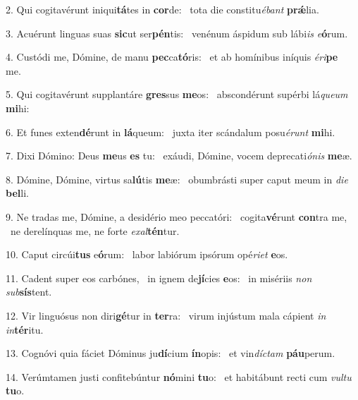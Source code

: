 2. Qui cogitavérunt iniqui\textbf{tá}tes in \textbf{cor}de: \ast\  tota die constitu\textit{é}\textit{bant} \textbf{prǽ}lia.\

3. Acuérunt linguas suas \textbf{sic}ut ser\textbf{pén}tis: \ast\  venénum áspidum sub lábi\textit{is} \textit{e}\textbf{ó}rum.\

4. Custódi me, Dómine, de manu \textbf{pec}ca\textbf{tó}ris: \ast\  et ab homínibus iníquis \textit{é}\textit{ri}\textbf{pe} me.\

5. Qui cogitavérunt supplantáre \textbf{gres}sus \textbf{me}os: \ast\  abscondérunt supérbi lá\textit{que}\textit{um} \textbf{mi}hi:\

6. Et funes exten\textbf{dé}runt in \textbf{lá}queum: \ast\  juxta iter scándalum posu\textit{é}\textit{runt} \textbf{mi}hi.\

7. Dixi Dómino: Deus \textbf{me}us \textbf{es} tu: \ast\  exáudi, Dómine, vocem deprecati\textit{ó}\textit{nis} \textbf{me}æ.\

8. Dómine, Dómine, virtus sa\textbf{lú}tis \textbf{me}æ: \ast\  obumbrásti super caput meum in \textit{di}\textit{e} \textbf{bel}li.\

9. Ne tradas me, Dómine, a desidério meo peccatóri: \dag\  cogita\textbf{vé}runt \textbf{con}tra me, \ast\  ne derelínquas me, ne forte \textit{ex}\textit{al}\textbf{tén}tur.\

10. Caput circúi\textbf{tus} e\textbf{ó}rum: \ast\  labor labiórum ipsórum opé\textit{ri}\textit{et} \textbf{e}os.\

11. Cadent super eos carbónes, \dag\  in ignem de\textbf{jí}cies \textbf{e}os: \ast\  in misériis \textit{non} \textit{sub}\textbf{sís}tent.\

12. Vir linguósus non diri\textbf{gé}tur in \textbf{ter}ra: \ast\  virum injústum mala cápient \textit{in} \textit{in}\textbf{tér}itu.\

13. Cognóvi quia fáciet Dóminus ju\textbf{dí}cium \textbf{ín}opis: \ast\  et vin\textit{díc}\textit{tam} \textbf{páu}perum.\

14. Verúmtamen justi confitebúntur \textbf{nó}mini \textbf{tu}o: \ast\  et habitábunt recti cum \textit{vul}\textit{tu} \textbf{tu}o.\

